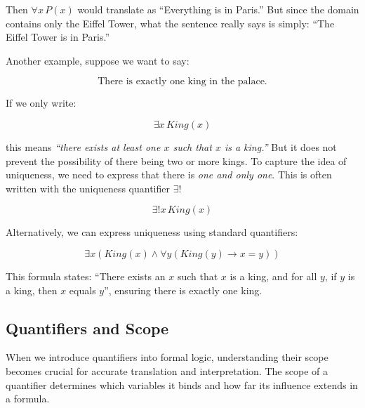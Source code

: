 \documentclass[12pt,a4paper,openany]{article}
\begin{document}
Then \(\forall x \, P(x)\) would translate as ``Everything is in
Paris.'' But since the domain contains only the Eiffel Tower, what the
sentence really says is simply: ``The Eiffel Tower is in Paris.''

Another example, suppose we want to say:

\[\text{There is exactly one king in the palace.}\]

If we only write:

\[\exists x \, King(x)\]

this means \emph{``there exists at least one \(x\) such that \(x\) is a
king.''} But it does not prevent the possibility of there being two or
more kings. To capture the idea of uniqueness, we need to express that
there is \emph{one and only one}. This is often written with the
uniqueness quantifier \(\exists!\)

\[\exists! x \, King(x)\]

Alternatively, we can express uniqueness using standard quantifiers:

\[\exists x (King(x) \land \forall y (King(y) \to x = y))\]

This formula states: ``There exists an \(x\) such that \(x\) is a king,
and for all \(y\), if \(y\) is a king, then \(x\) equals \(y\)'',
ensuring there is exactly one king.

\subsection{Quantifiers and Scope}\label{quantifiers-and-scope}

When we introduce quantifiers into formal logic, understanding their
scope becomes crucial for accurate translation and interpretation. The
scope of a quantifier determines which variables it binds and how far
its influence extends in a formula.
\end{document}

